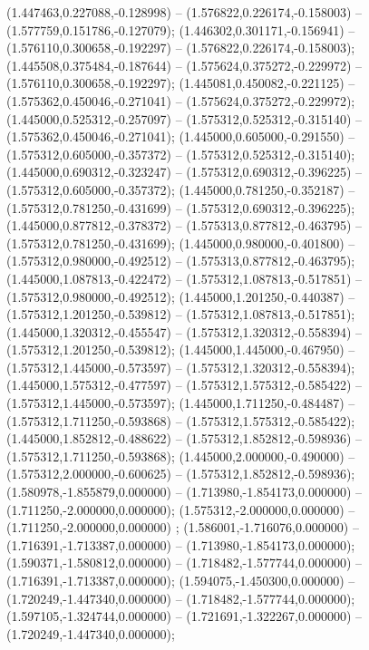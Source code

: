  (1.447463,0.227088,-0.128998) -- (1.576822,0.226174,-0.158003) -- (1.577759,0.151786,-0.127079);
 (1.446302,0.301171,-0.156941) -- (1.576110,0.300658,-0.192297) -- (1.576822,0.226174,-0.158003);
 (1.445508,0.375484,-0.187644) -- (1.575624,0.375272,-0.229972) -- (1.576110,0.300658,-0.192297);
 (1.445081,0.450082,-0.221125) -- (1.575362,0.450046,-0.271041) -- (1.575624,0.375272,-0.229972);
 (1.445000,0.525312,-0.257097) -- (1.575312,0.525312,-0.315140) -- (1.575362,0.450046,-0.271041);
 (1.445000,0.605000,-0.291550) -- (1.575312,0.605000,-0.357372) -- (1.575312,0.525312,-0.315140);
 (1.445000,0.690312,-0.323247) -- (1.575312,0.690312,-0.396225) -- (1.575312,0.605000,-0.357372);
 (1.445000,0.781250,-0.352187) -- (1.575312,0.781250,-0.431699) -- (1.575312,0.690312,-0.396225);
 (1.445000,0.877812,-0.378372) -- (1.575313,0.877812,-0.463795) -- (1.575312,0.781250,-0.431699);
 (1.445000,0.980000,-0.401800) -- (1.575312,0.980000,-0.492512) -- (1.575313,0.877812,-0.463795);
 (1.445000,1.087813,-0.422472) -- (1.575312,1.087813,-0.517851) -- (1.575312,0.980000,-0.492512);
 (1.445000,1.201250,-0.440387) -- (1.575312,1.201250,-0.539812) -- (1.575312,1.087813,-0.517851);
 (1.445000,1.320312,-0.455547) -- (1.575312,1.320312,-0.558394) -- (1.575312,1.201250,-0.539812);
 (1.445000,1.445000,-0.467950) -- (1.575312,1.445000,-0.573597) -- (1.575312,1.320312,-0.558394);
 (1.445000,1.575312,-0.477597) -- (1.575312,1.575312,-0.585422) -- (1.575312,1.445000,-0.573597);
 (1.445000,1.711250,-0.484487) -- (1.575312,1.711250,-0.593868) -- (1.575312,1.575312,-0.585422);
 (1.445000,1.852812,-0.488622) -- (1.575312,1.852812,-0.598936) -- (1.575312,1.711250,-0.593868);
 (1.445000,2.000000,-0.490000) -- (1.575312,2.000000,-0.600625) -- (1.575312,1.852812,-0.598936);
 (1.580978,-1.855879,0.000000) -- (1.713980,-1.854173,0.000000) -- (1.711250,-2.000000,0.000000);
 (1.575312,-2.000000,0.000000) -- (1.711250,-2.000000,0.000000) ;
 (1.586001,-1.716076,0.000000) -- (1.716391,-1.713387,0.000000) -- (1.713980,-1.854173,0.000000);
 (1.590371,-1.580812,0.000000) -- (1.718482,-1.577744,0.000000) -- (1.716391,-1.713387,0.000000);
 (1.594075,-1.450300,0.000000) -- (1.720249,-1.447340,0.000000) -- (1.718482,-1.577744,0.000000);
 (1.597105,-1.324744,0.000000) -- (1.721691,-1.322267,0.000000) -- (1.720249,-1.447340,0.000000);

